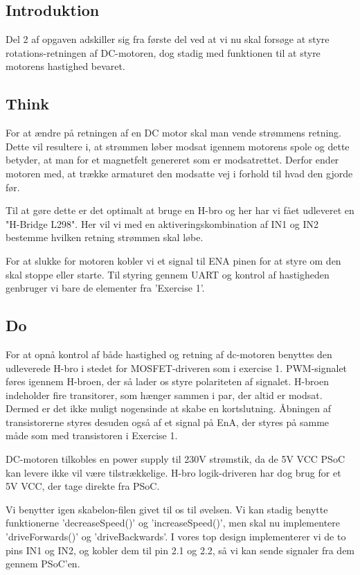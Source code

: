 \documentclass[../main.tex]{subfiles}
\begin{document}
\subsection{Introduktion}
Del 2 af opgaven adskiller sig fra første del ved at vi nu skal forsøge at styre rotations-retningen af DC-motoren, dog stadig med funktionen til at styre motorens hastighed bevaret.

\subsection{Think}
For at ændre på retningen af en DC motor skal man vende strømmens retning. 
Dette vil resultere i, at strømmen løber modsat igennem motorens spole og dette betyder, at man for et magnetfelt genereret som er modsatrettet.
Derfor ender motoren med, at trække armaturet den modsatte vej i forhold til hvad den gjorde før.

Til at gøre dette er det optimalt at bruge en H-bro og her har vi fået udleveret en "H-Bridge L298".
Her vil vi med en aktiveringskombination af IN1 og IN2 bestemme hvilken retning strømmen skal løbe.

For at slukke for motoren kobler vi et signal til ENA pinen for at styre om den skal stoppe eller starte. Til styring gennem UART og kontrol af hastigheden genbruger vi bare de elementer fra 'Exercise 1'.

\subsection{Do}

For at opnå kontrol af både hastighed og retning af dc-motoren benyttes den udleverede H-bro i stedet for MOSFET-driveren som i exercise 1. PWM-signalet føres igennem H-broen, der så lader os styre polariteten af signalet. H-broen indeholder fire transitorer, som hænger sammen i par, der altid er modsat. Dermed er det ikke muligt nogensinde at skabe en kortslutning. Åbningen af transistorerne styres desuden også af et signal på EnA, der styres på samme måde som med transistoren i Exercise 1.

DC-motoren tilkobles en power supply til 230V strømstik, da de 5V VCC PSoC kan levere ikke vil være tilstrækkelige. H-bro logik-driveren har dog brug for et 5V VCC, der tage direkte fra PSoC.


Vi benytter igen skabelon-filen givet til os til øvelsen. Vi kan stadig benytte funktionerne ’decreaseSpeed()’ og ’increaseSpeed()’, men skal nu implementere ’driveForwards()’ og ’driveBackwards’. I vores top design implementerer vi de to pins IN1 og IN2, og kobler dem til pin 2.1 og 2.2, så vi kan sende signaler fra dem gennem PSoC’en.
\end{document}
